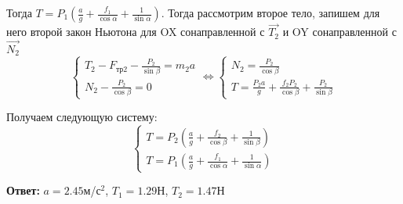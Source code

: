 \documentclass[a4paper,12pt]{article}
\begin{document}
    Тогда $T = P_1(\frac{a}{g} + \frac{f_1}{\cos\alpha} + \frac{1}{\sin{\alpha}})$. Тогда рассмотрим второе тело,
    запишем для него второй закон Ньютона для OX сонаправленной с $\vec{T_2}$ и OY сонаправленной
    с $\vec{N_2}$
    \[\begin{cases}
        T_2 - F_{\text{тр}2} - \frac{P_2}{\sin\beta} = m_2a \\
        N_2 - \frac{P_2}{\cos\beta} = 0
    \end{cases} \Leftrightarrow \begin{cases}
        N_2 = \frac{P_2}{\cos\beta} \\
        T = \frac{P_2a}{g} + \frac{f_2P_2}{\cos\beta} + \frac{P_2}{\sin\beta}
    \end{cases}\]

    Получаем следующую систему:
    \begin{equation}
        \begin{cases}
            T = P_2(\frac{a}{g} + \frac{f_2}{\cos\beta} + \frac{1}{\sin\beta}) \\
            T = P_1(\frac{a}{g} + \frac{f_1}{\cos\alpha} + \frac{1}{\sin\alpha})
        \end{cases}
    \end{equation}

    \begin{flushright}
        \textbf{Ответ:} $a = 2.45$м/с$^2$, $T_1 = 1.29$Н, $T_2 = 1.47$Н
    \end{flushright}
\end{document}
